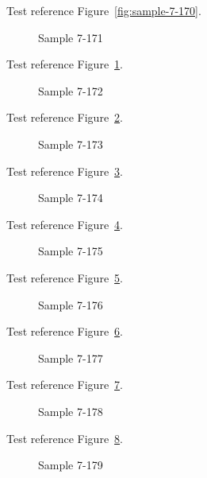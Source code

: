 Test reference Figure~\ref{fig:sample-7-170}.

\begin{figure}[tbhp]
\caption{Sample 7-171}
\label{fig:sample-7-171}
\end{figure}

Test reference Figure~\ref{fig:sample-7-171}.

\begin{figure}[tbhp]
\caption{Sample 7-172}
\label{fig:sample-7-172}
\end{figure}

Test reference Figure~\ref{fig:sample-7-172}.

\begin{figure}[tbhp]
\caption{Sample 7-173}
\label{fig:sample-7-173}
\end{figure}

Test reference Figure~\ref{fig:sample-7-173}.

\begin{figure}[tbhp]
\caption{Sample 7-174}
\label{fig:sample-7-174}
\end{figure}

Test reference Figure~\ref{fig:sample-7-174}.

\begin{figure}[tbhp]
\caption{Sample 7-175}
\label{fig:sample-7-175}
\end{figure}

Test reference Figure~\ref{fig:sample-7-175}.

\begin{figure}[tbhp]
\caption{Sample 7-176}
\label{fig:sample-7-176}
\end{figure}

Test reference Figure~\ref{fig:sample-7-176}.

\begin{figure}[tbhp]
\caption{Sample 7-177}
\label{fig:sample-7-177}
\end{figure}

Test reference Figure~\ref{fig:sample-7-177}.

\begin{figure}[tbhp]
\caption{Sample 7-178}
\label{fig:sample-7-178}
\end{figure}

Test reference Figure~\ref{fig:sample-7-178}.

\begin{figure}[tbhp]
\caption{Sample 7-179}
\label{fig:sample-7-179}
\end{figure}

